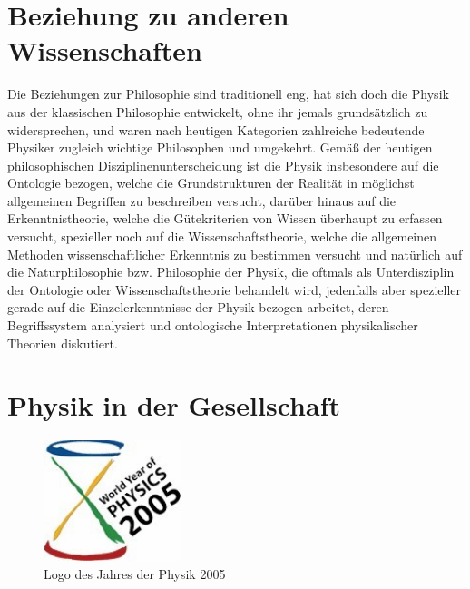 \documentclass[titlepage, parkskip=full, twocolumn, landscape]{scrartcl}
\begin{document}
\section{Beziehung zu anderen Wissenschaften}

Die Beziehungen zur Philosophie sind traditionell eng, hat sich doch die Physik aus der klassischen Philosophie entwickelt, ohne ihr jemals grundsätzlich zu widersprechen, und waren nach heutigen Kategorien zahlreiche bedeutende Physiker zugleich wichtige Philosophen und umgekehrt. Gemäß der heutigen philosophischen Disziplinenunterscheidung ist die Physik insbesondere auf die Ontologie bezogen, welche die Grundstrukturen der Realität in möglichst allgemeinen Begriffen zu beschreiben versucht, darüber hinaus auf die Erkenntnistheorie, welche die Gütekriterien von Wissen überhaupt zu erfassen versucht, spezieller noch auf die Wissenschaftstheorie, welche die allgemeinen Methoden wissenschaftlicher Erkenntnis zu bestimmen versucht und natürlich auf die Naturphilosophie bzw. Philosophie der Physik, die oftmals als Unterdisziplin der Ontologie oder Wissenschaftstheorie behandelt wird, jedenfalls aber spezieller gerade auf die Einzelerkenntnisse der Physik bezogen arbeitet, deren Begriffssystem analysiert und ontologische Interpretationen physikalischer Theorien diskutiert.

\section{Physik in der Gesellschaft}

\begin{figure}
	\centering
	\includegraphics[width=4cm]{images/6.jpg}
	\caption{Logo des Jahres der Physik 2005}
\end{figure}
\end{document}
